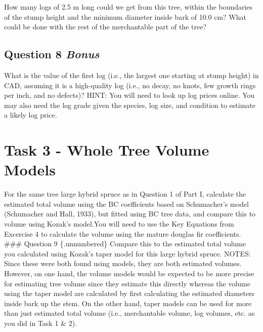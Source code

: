 \documentclass[
  letterpaper,
]{book}
\begin{document}
How many logs of 2.5 m long could we get from this tree, within the
boundaries of the stump height and the minimum diameter inside bark of
10.0 cm? What could be done with the rest of the merchantable part of
the tree?

\hypertarget{question-8-bonus}{%
\subsection*{\texorpdfstring{\textbf{Question 8}
\emph{Bonus}}{Question 8 Bonus}}\label{question-8-bonus}}

What is the value of the first log (i.e., the largest one starting at
stump height) in CAD, assuming it is a high-quality log (i.e., no decay,
no knots, few growth rings per inch, and no defects)? HINT: You will
need to look up log prices online. You may also need the log grade given
the species, log size, and condition to estimate a likely log price.

\hypertarget{task-3---whole-tree-volume-models}{%
\section*{Task 3 - Whole Tree Volume
Models}\label{task-3---whole-tree-volume-models}}


For the same tree large hybrid spruce as in Question 1 of Part I,
calculate the estimated total volume using the BC coefficients based on
Schumacher's model (Schumacher and Hall, 1933), but fitted using BC tree
data, and compare this to volume using Kozak's model.You will need to
use the Key Equations from Excercise 4 to calculate the volume using the
mature douglas fir coefficients. \#\#\# Question 9 \{.unnumbered\}
Compare this to the estimated total volume you calculated using Kozak's
taper model for this large hybrid spruce. NOTES: Since these were both
found using models, they are both estimated volumes. However, on one
hand, the volume models would be expected to be more precise for
estimating tree volume since they estimate this directly whereas the
volume using the taper model are calculated by first calculating the
estimated diameters inside bark up the stem. On the other hand, taper
models can be used for more than just estimated total volume (i.e.,
merchantable volume, log volumes, etc. as you did in Task 1 \& 2).
\end{document}
